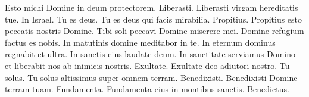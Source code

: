 \begin{multicols*}{2}
 Esto michi Domine in deum protectorem.
 Liberasti.
 Liberasti virgam hereditatis tue.
 In Israel.
 Tu es deus.
 Tu es deus qui facis mirabilia.
 Propitius.
 Propitius esto peccatis nostris Domine.
 Tibi soli peccavi Domine miserere mei.
 Domine refugium factus es nobis.
 In matutinis domine meditabor in te.
 In eternum dominus regnabit et ultra.
 In sanctis eius laudate deum.
 In sanctitate serviamus Domino et liberabit nos ab inimicis nostris.
 Exultate.
 Exultate deo adiutori nostro.
 Tu solus.
 Tu solus altissimus super omnem terram.
 Benedixisti.
 Benedixisti Domine terram tuam.
 Fundamenta.
 Fundamenta eius in montibus sanctis.
 Benedictus.

\end{multicols*}
